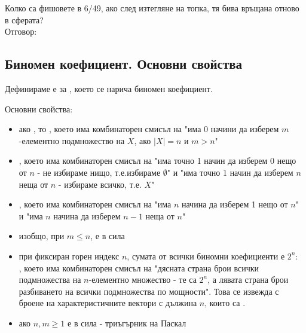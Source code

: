 \begin{example}
    Колко са фишовете в 6/49, ако след изтегляне на топка, тя бива връщана отново в сферата? \\
    Отговор: 
\end{example}

\subsection{Биномен коефициент. Основни свойства}
Дефинираме е  
за , което се нарича биномен коефициент.

Основни свойства:
\begin{itemize}
    \item ако , то , което има комбинаторен смисъл на "има 0 начини 
    да изберем \(m\)-елементно подмножество на \(X\), ако \(|X| = n\) и \(m > n\)"
    \item {}, което има комбинаторен смисъл на "има точно 1 начин да 
    изберем 0 нещо от \(n\) - не избираме нищо, т.е.избираме \(\emptyset\)" и "има точно 1 начин да 
    изберем \(n\) неща от \(n\) - избираме всичко, т.е. \(X\)"
    \item {}, което има комбинаторен смисъл на "има \(n\) начина 
    да изберем 1 нещо от \(n\)" и "има \(n\) начина да изберем \(n - 1\) неща от \(n\)"
    \item изобщо, при \(m \le n\), е в сила 
    \item при фиксиран горен индекс \(n\), сумата от всички биномни коефициенти е \(2^n\): \\
    , което има 
    комбинаторен смисъл на "дясната страна брои всички подмножества на \(n\)-елементно множество - те са 
    \(2^n\), а лявата страна брои разбиването на всички подмножества по мощности". Това се извежда с броене 
    на характеристичните вектори с дължина \(n\), които са .
    \item ако \(n, m \ge 1\) е в сила  - 
    триъгърник на Паскал
\end{itemize}

